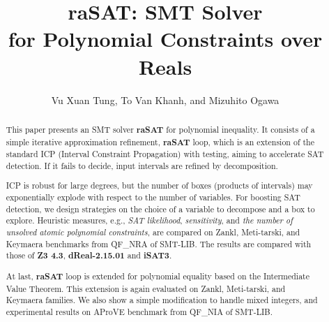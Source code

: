 \documentclass[runningheads,a4paper,oribibl]{llncs}
\begin{document}
%
\title{{\bf raSAT}: SMT Solver \\ for Polynomial Constraints over Reals}

\author{Vu Xuan Tung, To Van Khanh, and Mizuhito Ogawa} 


\maketitle

\begin{abstract}
This paper presents an SMT %
solver {\bf raSAT} for polynomial inequality. 
It consists of a simple iterative approximation refinement, {\bf raSAT} loop, 
which is an extension of the standard ICP (Interval Constraint Propagation) with testing, 
aiming to accelerate SAT detection. 
If it fails to decide, input intervals are refined by decomposition. 

ICP is robust for large degrees, but the number of boxes (products of intervals) 
may exponentially explode with respect to the number of variables. 
For boosting SAT detection, we design strategies on the choice of a variable to decompose
and a box to explore. Heuristic measures, e.g., {\em SAT likelihood}, {\em sensitivity}, and
{\em the number of unsolved atomic polynomial constraints}, are compared on Zankl, Meti-tarski, 
and Keymaera benchmarks from QF\_NRA  of SMT-LIB.
The results are compared with those of {\bf Z3 4.3}, \textbf{dReal-2.15.01} and {\bf iSAT3}. 

At last, {\bf raSAT} loop is extended for polynomial equality based on the Intermediate Value Theorem. 
This extension is again evaluated on Zankl, Meti-tarski, and Keymaera families.
We also show a simple modification to handle mixed integers, and experimental results on 
AProVE benchmark from QF\_NIA of SMT-LIB. 
\end{abstract}
\end{document}
